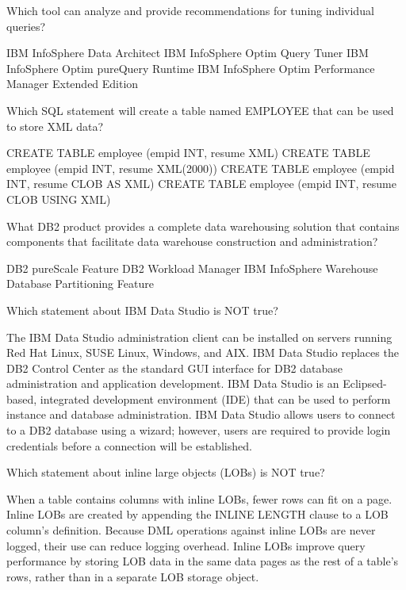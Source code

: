 \documentclass[11pt]{exam}
\begin{document}
\begin{questions}
\newpage
\addpoints
\question[1]
Which tool can analyze and provide recommendations for tuning individual queries?
\begin{choices}
\choice IBM InfoSphere Data Architect
\choice IBM InfoSphere Optim Query Tuner
\choice IBM InfoSphere Optim pureQuery Runtime
\choice IBM InfoSphere Optim Performance Manager Extended Edition
\end{choices}

\question[1]
Which SQL statement will create a table named EMPLOYEE that can be used to store XML data?
\begin{choices}
\choice CREATE TABLE employee (empid INT, resume XML)
\choice CREATE TABLE employee (empid INT, resume XML(2000))
\choice CREATE TABLE employee (empid INT, resume CLOB AS XML)
\choice CREATE TABLE employee (empid INT, resume CLOB USING XML)
\end{choices}

\question[1]
What DB2 product provides a complete data warehousing solution that contains components
that facilitate data warehouse construction and administration?
\begin{choices}
\choice DB2 pureScale Feature
\choice DB2 Workload Manager
\choice IBM InfoSphere Warehouse
\choice Database Partitioning Feature
\end{choices}

\question[1]
Which statement about IBM Data Studio is NOT true?
\begin{choices}
\choice The IBM Data Studio administration client can be installed on servers running Red Hat Linux, SUSE Linux,
		Windows, and AIX.
\choice IBM Data Studio replaces the DB2 Control Center as the standard GUI interface for DB2 database administration
		and application development.
\choice IBM Data Studio is an Eclipsed-based, integrated development environment (IDE) that can be used to perform
		instance and database administration.
\choice IBM Data Studio allows users to connect to a DB2 database using a wizard; however, users are required to provide
		login credentials before a connection will be established.
\end{choices}

\question[1]
Which statement about inline large objects (LOBs) is NOT true?
\begin{choices} 
\choice When a table contains columns with inline LOBs, fewer rows can fit on a page.
\choice Inline LOBs are created by appending the INLINE LENGTH clause to a LOB column's definition.
\choice Because DML operations against inline LOBs are never logged, their use can reduce logging overhead.
\choice Inline LOBs improve query performance by storing LOB data in the same data pages as the rest of a table's rows,
		rather than in a separate LOB storage object.
\end{choices}


\end{questions}
\end{document}
